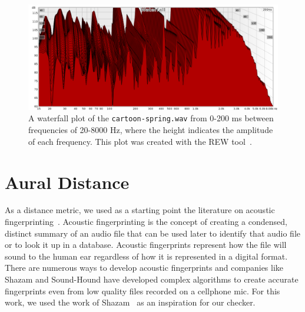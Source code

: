 
\begin{figure}[!ht]
\includegraphics[width=\textwidth]{figs/waterfall} 
\caption{A waterfall plot of the \texttt{cartoon-spring.wav} from 0-200 ms between frequencies of 20-8000 Hz, where the height indicates the amplitude of each frequency. This plot was created with the REW tool~\cite{REWTool}.}
\label{fig:waterfall}
\end{figure}

\section{Aural Distance}
\label{sec:distance}

As a distance metric, we used as a starting point the literature on acoustic fingerprinting~\cite{fingerprinting}.
Acoustic fingerprinting is the concept of creating a condensed, distinct summary of an audio file that can be used later to identify that audio file or to look it up in a database.
Acoustic fingerprints represent how the file will sound to the human ear regardless of how it is represented in a digital format.
There are numerous ways to develop acoustic fingerprints and companies like Shazam and Sound-Hound have developed complex algorithms to create accurate fingerprints even from low quality files recorded on a cellphone mic.
For this work, we used the work of Shazam~\cite{wang2003industrial} as an inspiration for our checker. 


